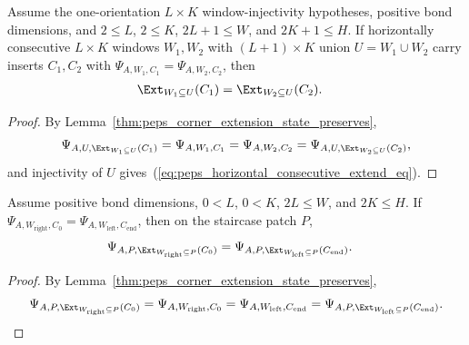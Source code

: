 \begin{lemma}
    \label{thm:peps_horizontal_consecutive_window_extend_eq}
    \leanok
    Assume the one-orientation $L\times K$ window-injectivity hypotheses,
    positive bond dimensions, and $2\le L$,
    $2\le K$, $2L+1\le W$, and $2K+1\le H$. If horizontally consecutive
    $L\times K$ windows $W_1,W_2$ with $(L+1)\times K$ union $U=W_1\cup W_2$
    carry inserts $C_1,C_2$ with $\Psi_{A,W_1,C_1}=\Psi_{A,W_2,C_2}$, then
    \begin{align}
        \Ext_{W_1\subseteq U}(C_1)
         & =
        \Ext_{W_2\subseteq U}(C_2).
        \label{eq:peps_horizontal_consecutive_extend_eq}
    \end{align}
\end{lemma}
\begin{proof}\leanok
    By Lemma~\ref{thm:peps_corner_extension_state_preserves},
    \begin{align}
        \Psi_{A,U,\Ext_{W_1\subseteq U}(C_1)}
        =\Psi_{A,W_1,C_1}
        =\Psi_{A,W_2,C_2}
        =\Psi_{A,U,\Ext_{W_2\subseteq U}(C_2)},
        \notag
    \end{align}
    and injectivity of $U$ gives~(\ref{eq:peps_horizontal_consecutive_extend_eq}).
\end{proof}



\begin{lemma}
    \label{thm:peps_horizontal_staircase_patch_extend_eq}
    \leanok
    Assume positive bond dimensions, $0<L$, $0<K$, $2L\le W$, and $2K\le H$. If
    $\Psi_{A,W_{\mathrm{right}},C_0}=\Psi_{A,W_{\mathrm{left}},C_{\mathrm{end}}}$,
    then on the staircase patch $P$,
    \begin{align}
        \Psi_{A,P,\Ext_{W_{\mathrm{right}}\subseteq P}(C_0)}
         & =
        \Psi_{A,P,\Ext_{W_{\mathrm{left}}\subseteq P}(C_{\mathrm{end}})}.
        \label{eq:peps_staircase_patch_extend_eq}
    \end{align}
\end{lemma}
\begin{proof}\leanok
    By Lemma~\ref{thm:peps_corner_extension_state_preserves},
    \begin{align}
        \Psi_{A,P,\Ext_{W_{\mathrm{right}}\subseteq P}(C_0)}
        =\Psi_{A,W_{\mathrm{right}},C_0}
        =\Psi_{A,W_{\mathrm{left}},C_{\mathrm{end}}}
        =\Psi_{A,P,\Ext_{W_{\mathrm{left}}\subseteq P}(C_{\mathrm{end}})}.
        \notag
    \end{align}
\end{proof}

